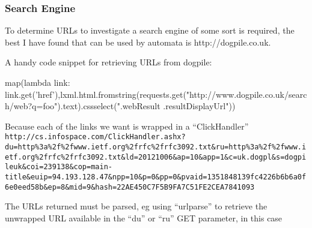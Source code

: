 \subsubsection{Search Engine}
To determine URLs to investigate a search engine of some sort is required, the best I have found that can be used by automata is http://dogpile.co.uk.

A handy code snippet for retrieving URLs from dogpile:

map(lambda link: link.get('href'),lxml.html.fromstring(requests.get("http://www.dogpile.co.uk/search/web?q=foo").text).cssselect(".webResult .resultDisplayUrl"))

Because each of the links we want is wrapped in a ``ClickHandler'' \verb`http://cs.infospace.com/ClickHandler.ashx?du=http%3a%2f%2fwww.ietf.org%2frfc%2frfc3092.txt&ru=http%3a%2f%2fwww.ietf.org%2frfc%2frfc3092.txt&ld=20121006&ap=10&app=1&c=uk.dogpl&s=dogpileuk&coi=239138&cop=main-title&euip=94.193.128.47&npp=10&p=0&pp=0&pvaid=1351848139fc4226b6b6a0f6e0eed58b&ep=8&mid=9&hash=22AE450C7F5B9FA7C51FE2CEA7841093`

The URLs returned must be parsed, eg using ``urlparse'' to retrieve the unwrapped URL available in the ``du'' or ``ru'' GET parameter, in this case\cite{rfc3092}